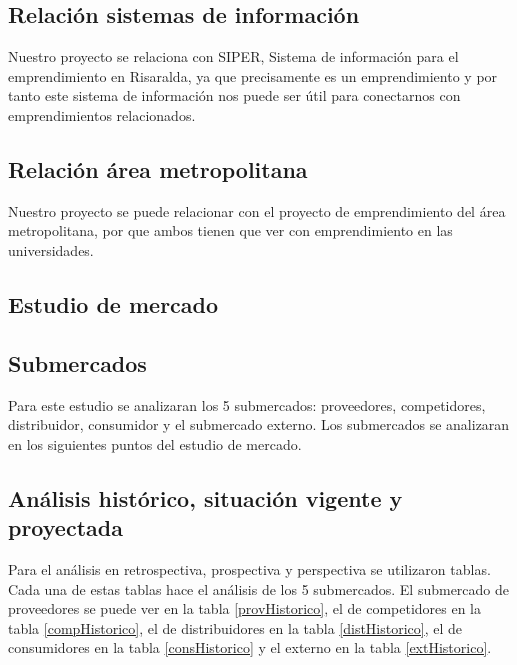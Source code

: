 \documentclass[a4paper, 12pt, oneside]{article}
\begin{document}
	\subsection{Relación sistemas de información}

	Nuestro proyecto se relaciona con SIPER, Sistema de información para el emprendimiento en Risaralda, ya que precisamente es un emprendimiento y por tanto este sistema de información nos puede ser útil para conectarnos con emprendimientos relacionados.

	\subsection{Relación área metropolitana}

	Nuestro proyecto se puede relacionar con el proyecto de emprendimiento del área metropolitana, por que ambos tienen que ver con emprendimiento en las universidades.

	\clearpage
	
	\begin{center}
	\section{Estudio de mercado}
	\end{center}
		
	\subsection{Submercados}
	Para este estudio se analizaran los 5 submercados: proveedores, competidores, distribuidor, consumidor y el submercado externo. Los submercados se analizaran en los siguientes puntos del estudio de mercado.	

	\subsection{Análisis histórico, situación vigente y proyectada}
	Para el análisis en retrospectiva, prospectiva y perspectiva se utilizaron tablas. Cada una de estas tablas hace el análisis de los 5 submercados. El submercado de proveedores se puede ver en la tabla \ref{provHistorico}, el de competidores en la tabla \ref{compHistorico}, el de distribuidores en la tabla \ref{distHistorico}, el de consumidores en la tabla \ref{consHistorico} y el externo en la tabla \ref{extHistorico}.	
	
\end{document}
